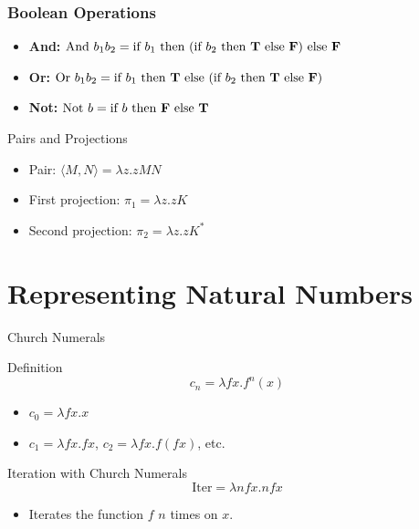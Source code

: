 \documentclass{beamer}
\begin{document}
\begin{frame}
  \frametitle{Boolean Operations}
  \begin{itemize}
    \item \textbf{And:} \(\text{And }b_1b_2 = \text{if }b_1 \text{ then (if }b_2 \text{ then \textbf{T} else \textbf{F}) else \textbf{F}}\)
    \item \textbf{Or:  } \(\text{Or }b_1b_2 = \text{if }b_1 \text{ then \textbf{T} else (if }b_2 \text{ then \textbf{T} else \textbf{F})}\)
    \item \textbf{Not:} \(\text{Not }b = \text{if }b \text{ then \textbf{F} else \textbf{T}}\)
  \end{itemize}
\end{frame}

\begin{frame}{Pairs and Projections}
  \begin{itemize}
    \item Pair: \(\langle M, N \rangle = \lambda z. zMN\)
    \item First projection: \(\pi_1 = \lambda z. zK\)
    \item Second projection: \(\pi_2 = \lambda z. zK^*\)
  \end{itemize}
\end{frame}

\section{Representing Natural Numbers}
\begin{frame}{Church Numerals}
  \begin{block}{Definition}
    \[
    c_n = \lambda f x. f^n(x)
    \]
    \begin{itemize}
      \item \(c_0 = \lambda f x. x\)
      \item \(c_1 = \lambda f x. f x\), \(c_2 = \lambda f x. f (f x)\), etc.
    \end{itemize}
  \end{block}
\end{frame}

\begin{frame}{Iteration with Church Numerals}
  \[
    \text{Iter} = \lambda nfx. n f x
  \]
  \begin{itemize}
    \item Iterates the function \(f\) \(n\) times on \(x\).
  \end{itemize}
\end{frame}
\end{document}
